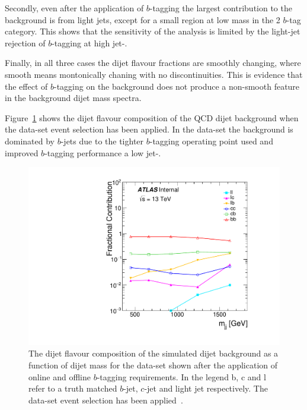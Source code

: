 Secondly, even after the application of $b$-tagging the largest contribution to the background is from light jets,
except for a small region at low mass in the 2 $b$-tag category.
This shows that the sensitivity of the analysis is limited by the
light-jet rejection of $b$-tagging at high jet-\pT.

Finally, in all three cases the dijet flavour fractions are smoothly changing,
where smooth means montonically chaning with no discontinuities.
This is evidence that the effect of $b$-tagging on the background does not produce
a non-smooth feature in the background dijet mass spectra.

Figure~\ref{fig:evt-lowmass_flavcomp} shows the dijet flavour composition of the QCD dijet background
when the \lm{} data-set event selection has been applied.
In the \lm{} data-set the background is dominated by $b$-jets
due to the tighter $b$-tagging operating point used and improved $b$-tagging performance a low jet-\pT.

\begin{figure}[!ht]
  \begin{center}
    \includegraphics[width=0.6\linewidth, angle=0]{figs/Dibjet/LowMass/evt-flavcomp.pdf}
  \end{center}
  \caption[The dijet flavour composition of the simulated dijet background as a function of dijet mass (\mjj) for the \lm{} data-set
    shown after the application of online and offline $b$-tagging requirements.
    In the legend b, c and l refer to a truth matched $b$-jet, $c$-jet and light jet respectively.
    The \lm{} data-set event selection has been applied.]
          {The dijet flavour composition of the simulated dijet background as a function of dijet mass for the \lm{} data-set
            shown after the application of online and offline $b$-tagging requirements.
            In the legend b, c and l refer to a truth matched $b$-jet, $c$-jet and light jet respectively.
            The \lm{} data-set event selection has been applied~\cite{dibjet-full_int}.}
  \label{fig:evt-lowmass_flavcomp}
\end{figure}

